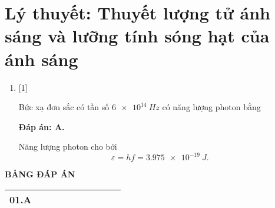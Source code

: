 \section{Lý thuyết: Thuyết lượng tử ánh sáng và lưỡng tính sóng hạt của ánh sáng}
\begin{enumerate}[label=\bfseries Câu \arabic*:]
	
	\item {} [1]
	
	\cauhoi
	{Bức xạ đơn sắc có tần số $\SI{6e14}{Hz}$ có năng lượng photon bằng 
	}
	
	\loigiai
	{		\textbf{Đáp án: A.}
		
		Năng lượng photon cho bởi
		$$
		\varepsilon = hf = \SI{3,975e-19}{J}.
		$$
	}

	
\end{enumerate}

\loigiai
{
	\begin{center}
		\textbf{BẢNG ĐÁP ÁN}
	\end{center}
	\begin{center}
		\begin{tabular}{|m{2.8em}|m{2.8em}|m{2.8em}|m{2.8em}|m{2.8em}|m{2.8em}|m{2.8em}|m{2.8em}|m{2.8em}|m{2.8em}|}
			\hline
			01.A  &  &  &  &  &  & & & & \\
			\hline
			
		\end{tabular}
	\end{center}
}

\whiteBGstarEnd
